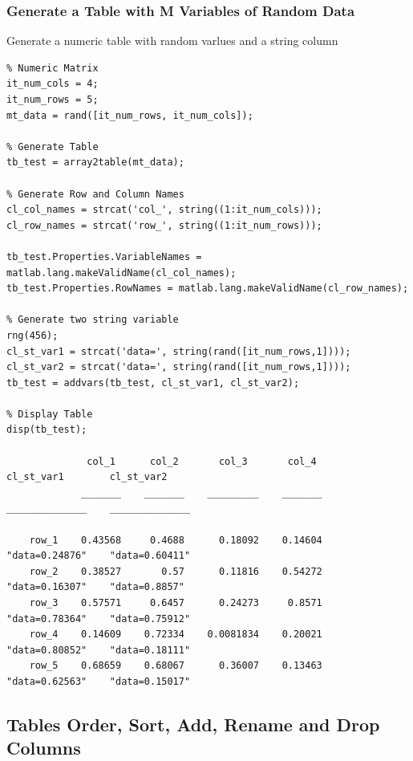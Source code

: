\documentclass[
]{book}
\begin{document}
\hypertarget{generate-a-table-with-m-variables-of-random-data}{%
\subsubsection{Generate a Table with M Variables of Random Data}\label{generate-a-table-with-m-variables-of-random-data}}

Generate a numeric table with random varlues and a string column

\begin{verbatim}
% Numeric Matrix
it_num_cols = 4;
it_num_rows = 5;
mt_data = rand([it_num_rows, it_num_cols]);

% Generate Table
tb_test = array2table(mt_data);

% Generate Row and Column Names
cl_col_names = strcat('col_', string((1:it_num_cols)));
cl_row_names = strcat('row_', string((1:it_num_rows)));

tb_test.Properties.VariableNames = matlab.lang.makeValidName(cl_col_names);
tb_test.Properties.RowNames = matlab.lang.makeValidName(cl_row_names);

% Generate two string variable
rng(456);
cl_st_var1 = strcat('data=', string(rand([it_num_rows,1])));
cl_st_var2 = strcat('data=', string(rand([it_num_rows,1])));
tb_test = addvars(tb_test, cl_st_var1, cl_st_var2);

% Display Table
disp(tb_test);

              col_1      col_2       col_3       col_4       cl_st_var1        cl_st_var2  
             _______    _______    _________    _______    ______________    ______________

    row_1    0.43568     0.4688      0.18092    0.14604    "data=0.24876"    "data=0.60411"
    row_2    0.38527       0.57      0.11816    0.54272    "data=0.16307"    "data=0.8857" 
    row_3    0.57571     0.6457      0.24273     0.8571    "data=0.78364"    "data=0.75912"
    row_4    0.14609    0.72334    0.0081834    0.20021    "data=0.80852"    "data=0.18111"
    row_5    0.68659    0.68067      0.36007    0.13463    "data=0.62563"    "data=0.15017"
\end{verbatim}

\hypertarget{tables-order-sort-add-rename-and-drop-columns}{%
\subsection{Tables Order, Sort, Add, Rename and Drop Columns}\label{tables-order-sort-add-rename-and-drop-columns}}
\end{document}
